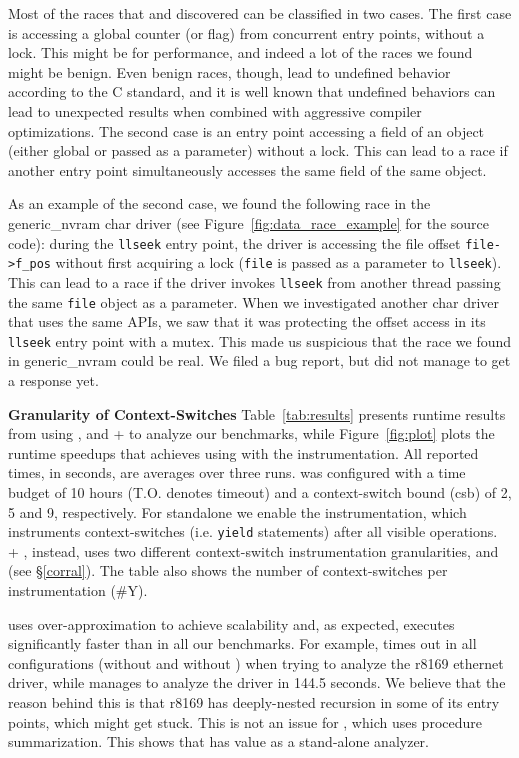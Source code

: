 Most of the races that \whoop and \corral discovered can be classified in two cases. The first case is accessing a global counter (or flag) from concurrent entry points, without a lock. This might be for performance, and indeed a lot of the races we found might be benign. Even benign races, though, lead to undefined behavior according to the C standard, and it is well known that undefined behaviors can lead to unexpected results when combined with aggressive compiler optimizations. The second case is an entry point accessing a field of an object (either global or passed as a parameter) without a lock. This can lead to a race if another entry point simultaneously accesses the same field of the same object.

As an example of the second case, we found the following race in the generic\_nvram char driver (see Figure~\ref{fig:data_race_example} for the source code): during the \texttt{llseek} entry point, the driver is accessing the file offset \texttt{file->f\_pos} without first acquiring a lock (\texttt{file} is passed as a parameter to \texttt{llseek}). This can lead to a race if the driver invokes \texttt{llseek} from another thread passing the same \texttt{file} object as a parameter. When we investigated another char driver that uses the same APIs, we saw that it was protecting the offset access in its \texttt{llseek} entry point with a mutex. This made us suspicious that the race we found in generic\_nvram could be real. We filed a bug report, but did not manage to get a response yet.

\medskip\noindent\textbf{Granularity of Context-Switches }
%
Table~\ref{tab:results} presents runtime results from using \whoop, \corral and \whoop + \corral to analyze our benchmarks, while Figure~\ref{fig:plot} plots the runtime speedups that \corral achieves using \whoop with the \yieldmr instrumentation. All reported times, in seconds, are averages over three runs. \corral was configured with a time budget of 10 hours (T.O. denotes timeout) and a context-switch bound (csb) of 2, 5 and 9, respectively. For standalone \corral we enable the \yieldall instrumentation, which instruments context-switches (i.e. \texttt{yield} statements) after all visible operations. \whoop + \corral, instead, uses two different context-switch instrumentation granularities, \yieldcoarse and \yieldmr (see \S\ref{corral}). The table also shows the number of context-switches per instrumentation (\#Y).

\whoop uses over-approximation to achieve scalability and, as expected, executes significantly faster than \corral in all our benchmarks. For example, \corral times out in all configurations (without and without \whoop) when trying to analyze the r8169 ethernet driver, while \whoop manages to analyze the driver in 144.5 seconds. We believe that the reason behind this is that r8169 has deeply-nested recursion in some of its entry points, which might get \corral stuck. This is not an issue for \whoop, which uses procedure summarization. This shows that \whoop has value as a stand-alone analyzer.

